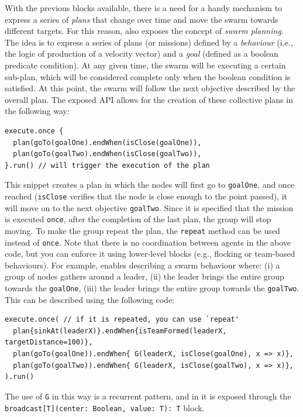 With the previous blocks available, there is a need for a handy mechanism to express a series of \emph{plans} that 
 change over time and move the swarm towards different targets. 
%
For this reason, \MacroSwarm{} also exposes the concept of \emph{swarm planning}. 
The idea is to express a series of plans (or missions)
 defined by a \emph{behaviour} 
 (i.e., the logic of production of a velocity vector) 
 and a \emph{goal} (defined as a boolean predicate condition). 
%
At any given time, the swarm will be executing a certain sub-plan, 
 which will be considered complete only when the boolean condition is satisfied. 
%
At this point, the swarm will follow the next objective described by the overall plan.
%
The exposed API allows for the creation of these collective plans in the following way:
\begin{lstlisting}
execute.once {
  plan(goTo(goalOne).endWhen(isClose(goalOne)),
  plan(goTo(goalTwo).endWhen(isClose(goalTwo)),
}.run() // will trigger the execution of the plan
\end{lstlisting}
This snippet creates a plan 
 in which the nodes will first go to \lstinline|goalOne|, 
 and once reached (\lstinline|isClose| verifies that the node is close enough to the point passed), 
 it will move on to the next objective \lstinline|goalTwo|.
Since it is specified that the mission is executed \lstinline|once|, 
 after the completion of the last plan, the group will stop moving.
To make the group repeat the plan, 
 the \lstinline|repeat| method can be used instead of \lstinline|once|.
%
Note that there is no coordination between agents in the above code, 
 but you can enforce it using lower-level blocks (e.g., flocking or team-based behaviours).
%
For example, \MacroSwarm{} enables describing a swarm behaviour where:
(i) a group of nodes gathers around a leader,
(ii) the leader brings the entire group towards the \lstinline|goalOne|,
(iii) the leader brings the entire group towards the \lstinline|goalTwo|.
%
This can be described using the following code:
\begin{lstlisting}[xrightmargin=-5pt]
execute.once( // if it is repeated, you can use `repeat'
  plan{sinkAt(leaderX)}.endWhen{isTeamFormed(leaderX, targetDistance=100)},
  plan(goTo(goalOne)).endWhen{ G(leaderX, isClose(goalOne), x => x)},
  plan(goTo(goalTwo)).endWhen{ G(leaderX, isClose(goalTwo), x => x)},
).run()
\end{lstlisting}
The use of \lstinline|G| in this way is a recurrent pattern, 
 and in \scafi{} it is exposed through the \lstinline|broadcast[T](center: Boolean, value: T): T| block.
 
